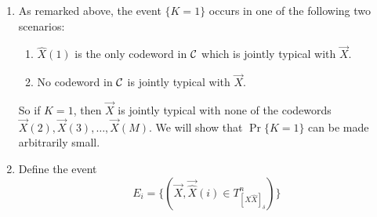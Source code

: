 \documentclass[../main.tex]{subfiles}
\begin{document}
 \begin{enumerate}
     \item As remarked above, the event $\{K=1\}$ occurs in one of the following two scenarios: \begin{enumerate}
             \item $\hat X(1)$ is the only codeword in $\mathcal{C}$ which is jointly typical with $\vec X$.
             \item No codeword in $\mathcal{C}$ is jointly typical with $\vec X$.
         \end{enumerate}
    So if $K=1$, then $\vec X$ is jointly typical with none of the codewords $\vec X(2), \vec X(3),\dots,\vec X(M)$. We will show that $\Pr\{K=1\}$ can be made arbitrarily small.
    \item Define the event 
    \[
    E_i = \{(\vec X, \vec{\hat X}(i)\in T^n_{[X\hat X]_\delta})\}
    \]
    

\end{enumerate}
\end{document}
